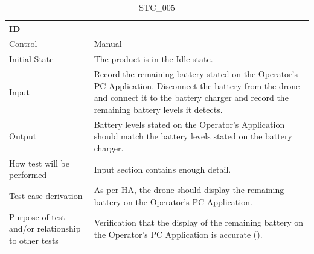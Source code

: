\documentclass[12pt, titlepage]{article}
\begin{document}
\begin{table}[!h]
\begin{center}
\caption {STC\_005}
\label{tab:STC_005}
\begin{tabular}{ | m{3.2cm} | m{12.2cm} | } 
\hline
ID & \nameref{tab:STC_005} \\ 
\hline
Control & Manual \\ 
\hline
Initial State & The product is in the Idle state. \\ 
\hline
Input & Record the remaining battery stated on the Operator's PC Application. Disconnect the battery from the drone and connect it to the battery charger and record the remaining battery levels it detects. \\ 
\hline
Output & Battery levels stated on the Operator's Application should match the battery levels stated on the battery charger. \\ 
\hline
How test will be performed & Input section contains enough detail. \\ 
\hline
Test case derivation & As per HA, the drone should display the remaining battery on the Operator's PC Application. \\ 
\hline
Purpose of test and/or relationship to other tests & Verification that the display of the remaining battery on the Operator's PC Application is accurate (\nameref{SR_003}). \\ 
\hline
\end{tabular}
\end{center}
\end{table}
\end{document}
